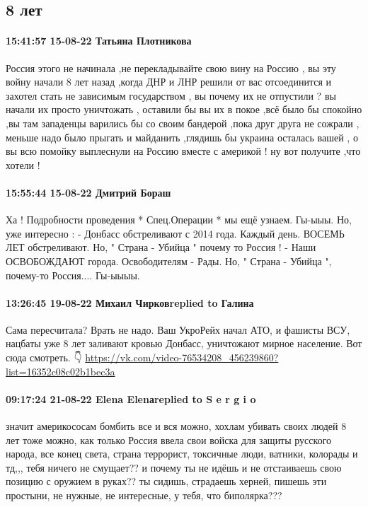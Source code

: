  
 
 
 
 

\subsection{8 лет}


\paragraph{15:41:57 15-08-22 Татьяна Плотникова}

Россия этого не начинала ,не перекладывайте свою вину на Россию , вы эту войну
начали 8 лет назад ,когда ДНР и ЛНР решили от вас отсоединится и захотел стать
не зависимым государством , вы почему их не отпустили ? вы начали их просто
уничтожать , оставили бы вы их в покое ,всё было бы спокойно ,вы там западенцы
варились бы со своим бандерой ,пока друг друга не сожрали , меньше надо было
прыгать и майданить ,глядишь бы украина осталась вашей , о вы всю помойку
выплеснули на Россию вместе с америкой ! ну вот получите ,что хотели !

\paragraph{15:55:44 15-08-22 Дмитрий Бораш}

Ха !   Подробности проведения * Спец.Операции * мы ещё узнаем.   Гы-ыыы. 
Но, уже интересно : 
- Донбасс обстреливают с 2014 года.   Каждый день.  ВОСЕМЬ ЛЕТ обстреливают.  
Но, " Страна - Убийца " почему то Россия !    
- Наши ОСВОБОЖДАЮТ города.  Освободителям - Рады.     Но, " Страна - Убийца ", почему-то Россия....       Гы-ыыыы.

\paragraph{13:26:45 19-08-22 Михаил Чирковreplied to Галина}

Сама пересчитала?
Врать не надо. Ваш УкроРейх начал АТО, и
фашисты ВСУ, нацбаты уже 8 лет заливают кровью Донбасс, уничтожают мирное население.
Вот сюда смотреть. 👇
\url{https://vk.com/video-76534208_456239860?list=16352c08c02b1bec3a}

\paragraph{09:17:24 21-08-22 Elena Elenаreplied to S e r g i o}

значит америкососам бомбить все и вся можно, хохлам убивать своих людей 8 лет
тоже можно, как только Россия ввела свои войска для защиты русского народа, все
конец света, страна террорист, токсичные люди, ватники, колорады и тд,,, тебя
ничего не смущает?? и почему ты не идёшь и не отстаиваешь свою позицию с
оружием в руках?? ты сидишь, страдаешь херней, пишешь эти простыни, не нужные,
не интересные, у тебя, что биполярка???
